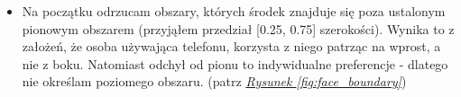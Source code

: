\begin{itemize}
    \item Na początku odrzucam obszary, których środek znajduje się poza ustalonym pionowym obszarem (przyjąłem przedział [0.25, 0.75] szerokości). Wynika to z założeń, że osoba używająca telefonu, korzysta z niego patrząc na wprost, a nie z boku. Natomiast odchył od pionu to indywidualne preferencje - dlatego nie określam poziomego obszaru. (patrz \hyperref[{fig:face_boundary}]{\textit{Rysunek \ref{fig:face_boundary}}})

    \begin{figure}[!h]
        \begin{center}
            \hspace{8mm}

\end{center}
\end{figure}
\end{itemize}
